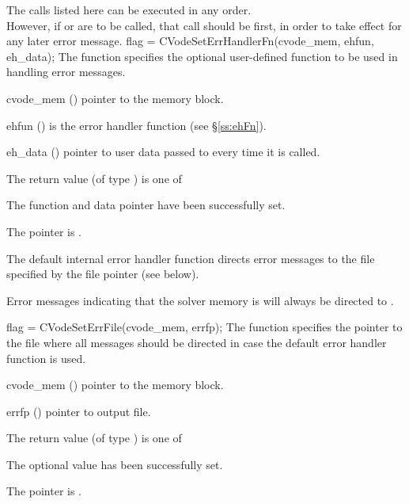The calls listed here can be executed in any order. \\
However, if 
or  are to be called, that call should be first, in order to take 
effect for any later error message.
{
flag = CVodeSetErrHandlerFn(cvode\_mem, ehfun, eh\_data);
}
{
  The function  specifies the optional user-defined function
  to be used in handling error messages.
}
{
  \begin{args}
  \item[cvode\_mem] ()
    pointer to the {\cvode} memory block.
  \item[ehfun] () 
    is the {\C} error handler function (see \S\ref{ss:ehFn}).
  \item[eh\_data] ()
    pointer to user data passed to  every time it is called.
  \end{args}
}
{
  The return value  (of type ) is one of
  \begin{args}
  \item[\Id{CV\_SUCCESS}] 
    The function  and data pointer  have been successfully set.
  \item[\Id{CV\_MEM\_NULL}]
    The  pointer is .
  \end{args}
}
{
  The default internal error handler function directs error messages to the
  file specified by the file pointer  (see  below).

  Error messages indicating that the {\cvode} solver memory is  will 
  always be directed to .
}
{
flag = CVodeSetErrFile(cvode\_mem, errfp);
}
{
  The function  specifies the pointer to the file
  where all {\cvode} messages should be directed in case the default
  {\cvode} error handler function is used.
}
{
  \begin{args}
  \item[cvode\_mem] ()
    pointer to the {\cvode} memory block.
  \item[errfp] ()
    pointer to output file.
  \end{args}
}
{
  The return value  (of type ) is one of
  \begin{args}
  \item[\Id{CV\_SUCCESS}] 
    The optional value has been successfully set.
  \item[\Id{CV\_MEM\_NULL}]
    The  pointer is .
  \end{args}
}
